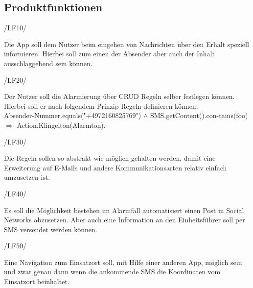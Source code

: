 \subsection{Produktfunktionen}
\begin{minipage}{3cm}
/LF10/
\end{minipage}
\begin{minipage}{13cm}
Die App soll dem Nutzer beim eingehen von Nachrichten \"uber den Erhalt speziell informieren. Hierbei soll zum einen der Absender aber auch der Inhalt ausschlaggebend sein k\"onnen.\\
\end{minipage}
\begin{minipage}{3cm}
/LF20/
\end{minipage}
\begin{minipage}{13cm}
Der Nutzer soll die Alarmierung \"uber CRUD Regeln selber festlegen k\"onnen. Hierbei soll er nach folgendem Prinzip Regeln definieren k\"onnen.\\
Absender-Nummer.equals("+4972160825769") $\wedge$ SMS.getContent().con-tains(foo)
$\Rightarrow$ Action.Klingelton(Alarmton).\\
\end{minipage}
\begin{minipage}{3cm}
/LF30/
\end{minipage}
\begin{minipage}{13cm}
Die Regeln sollen so abstrakt wie m\"oglich gehalten werden, damit eine Erweiterung auf E-Mails und andere Kommunikationsarten relativ einfach umzusetzen ist.\\
\end{minipage}
\begin{minipage}{3cm}
/LF40/
\end{minipage}
\begin{minipage}{13cm}
Es soll die M\"oglichkeit bestehen im Alarmfall automatisiert einen Post in Social Networks abzusetzen. Aber auch eine Information an den Einheitsf\"uhrer soll per SMS versendet werden k\"onnen.\\
\end{minipage}
\begin{minipage}{3cm}
/LF50/
\end{minipage}
\begin{minipage}{13cm}
Eine Navigation zum Einsatzort soll, mit Hilfe einer anderen App, m\"oglich sein und zwar genau dann wenn die ankommende SMS die Koordinaten vom Einsatzort beinhaltet.\\
\end{minipage}
